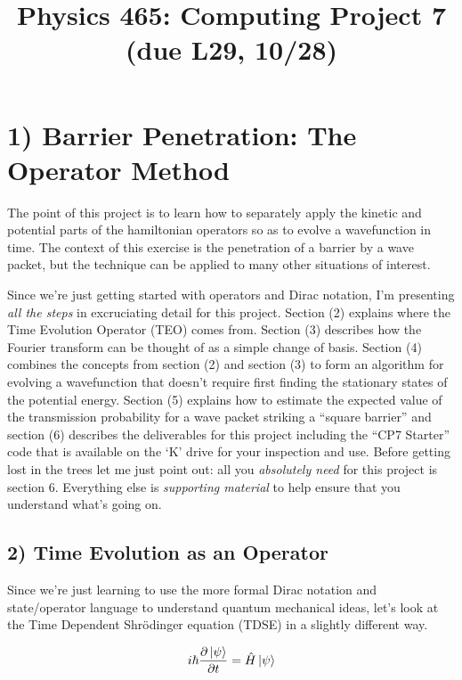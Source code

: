 \documentclass[11pt]{article} %
\title{Physics 465: Computing Project 7 (due L29, 10/28)}
\begin{document}
\maketitle

\section*{1) Barrier Penetration: The Operator Method}

The point of this project is to learn how to separately apply the kinetic and potential parts of the hamiltonian operators so as to evolve a wavefunction in time. The context of this exercise is the penetration of a barrier by a wave packet, but the technique can be applied to many other situations of interest. 

Since we're just getting started with operators and Dirac notation, I'm presenting {\it all the steps} in excruciating detail for this project. Section (2) explains where the Time Evolution Operator (TEO) comes from. Section (3) describes how the Fourier transform can be thought of as a simple change of basis. Section (4) combines the concepts from section (2) and section (3) to form an algorithm for evolving a wavefunction that doesn't require first finding the stationary states of the potential energy. Section (5) explains how to estimate the expected value of the transmission probability for a wave packet striking a ``square barrier'' and section (6) describes the deliverables for this project including the ``CP7 Starter'' code that is available on the `K' drive for your inspection and use. Before getting lost in the trees let me just point out: all you {\it absolutely need} for this project is section 6. Everything else is {\it supporting material} to help ensure that you understand what's going on.

\subsection*{2) Time Evolution as an Operator}

Since we're just learning to use the more formal Dirac notation and state/operator language to understand quantum mechanical ideas, let's look at the Time Dependent Shr\"odinger equation (TDSE) in a slightly different way.

\begin{equation}
i\hbar \frac{\partial \ket{\psi}}{\partial t} = \hat{H}\ket{\psi}
\end{equation}
\end{document}
